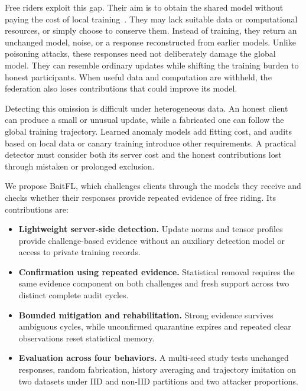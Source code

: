\documentclass[conference]{IEEEtran}
\begin{document}
Free riders exploit this gap. Their aim is to obtain the shared model
without paying the cost of local training~\cite{lin2019freeriders,fraboni2021freerider}.
They may lack suitable data or computational resources, or simply choose
to conserve them. Instead of training, they return an unchanged model,
noise, or a response reconstructed from earlier models. Unlike poisoning
attacks, these responses need not deliberately damage the global model.
They can resemble ordinary updates while shifting the training burden
to honest participants. When useful data and computation are withheld,
the federation also loses contributions that could improve its model.

Detecting this omission is difficult under heterogeneous data. An honest
client can produce a small or unusual update, while a fabricated one can
follow the global training trajectory. Learned anomaly models add fitting
cost, and audits based on local data or canary training introduce other
requirements. A practical detector must consider both its server cost
and the honest contributions lost through mistaken or prolonged exclusion.

We propose BaitFL, which challenges clients through the models they receive
and checks whether their responses provide repeated evidence of free
riding. Its contributions are:
\begin{itemize}
\item \textbf{Lightweight server-side detection.} Update norms and tensor
profiles provide challenge-based evidence without an auxiliary detection
model or access to private training records.
\item \textbf{Confirmation using repeated evidence.} Statistical removal
requires the same evidence component on both challenges and fresh support
across two distinct complete audit cycles.
\item \textbf{Bounded mitigation and rehabilitation.} Strong evidence
survives ambiguous cycles, while unconfirmed quarantine expires and
repeated clear observations reset statistical memory.
\item \textbf{Evaluation across four behaviors.} A multi-seed study tests
unchanged responses, random fabrication, history averaging and trajectory
imitation on two datasets under IID and non-IID partitions and two
attacker proportions.
\end{itemize}
\end{document}
